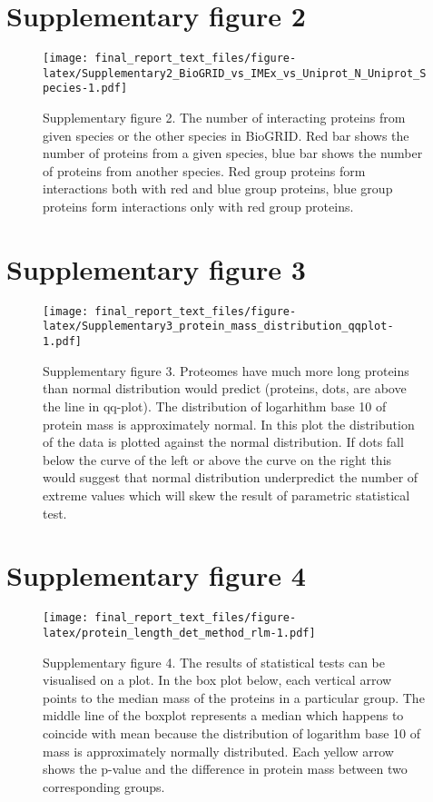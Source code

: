 \documentclass[12pt,]{report}
\begin{document}
\section{Supplementary figure 2}\label{supplementary-figure-2}

\begin{figure}
\centering
\texttt{[image: final\_report\_text\_files/figure-latex/Supplementary2\_BioGRID\_vs\_IMEx\_vs\_Uniprot\_N\_Uniprot\_Species-1.pdf]}
\caption{Supplementary figure 2. The number of interacting proteins from
given species or the other species in BioGRID. Red bar shows the number
of proteins from a given species, blue bar shows the number of proteins
from another species. Red group proteins form interactions both with red
and blue group proteins, blue group proteins form interactions only with
red group proteins.}
\end{figure}

\section{Supplementary figure 3}\label{supplementary-figure-3}

\begin{figure}
\centering
\texttt{[image: final\_report\_text\_files/figure-latex/Supplementary3\_protein\_mass\_distribution\_qqplot-1.pdf]}
\caption{Supplementary figure 3. Proteomes have much more long proteins
than normal distribution would predict (proteins, dots, are above the
line in qq-plot). The distribution of logarhithm base 10 of protein mass
is approximately normal. In this plot the distribution of the data is
plotted against the normal distribution. If dots fall below the curve of
the left or above the curve on the right this would suggest that normal
distribution underpredict the number of extreme values which will skew
the result of parametric statistical test.}
\end{figure}

\section{Supplementary figure 4}\label{supplementary-figure-4}

\begin{figure}
\centering
\texttt{[image: final\_report\_text\_files/figure-latex/protein\_length\_det\_method\_rlm-1.pdf]}
\caption{Supplementary figure 4. The results of statistical tests can be
visualised on a plot. In the box plot below, each vertical arrow points
to the median mass of the proteins in a particular group. The middle
line of the boxplot represents a median which happens to coincide with
mean because the distribution of logarithm base 10 of mass is
approximately normally distributed. Each yellow arrow shows the p-value
and the difference in protein mass between two corresponding groups.}
\end{figure}


\end{document}
